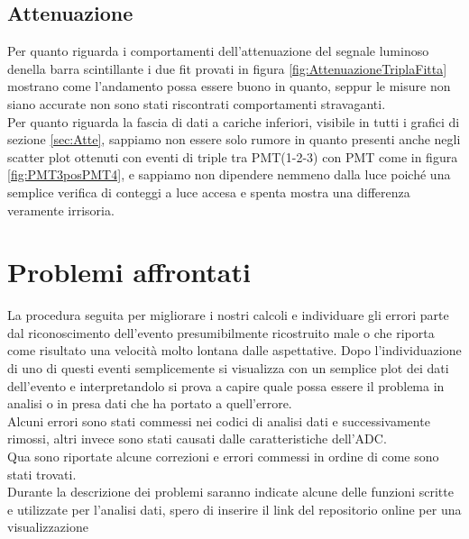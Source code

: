\documentclass[a4paper]{article}
\begin{document}
\subsection{Attenuazione}
Per quanto riguarda i comportamenti dell'attenuazione del segnale luminoso denella barra scintillante i due fit provati in figura \ref{fig:AttenuazioneTriplaFitta} mostrano come l'andamento possa essere buono in quanto, seppur le misure non siano accurate non sono
stati riscontrati comportamenti stravaganti.\\
Per quanto riguarda la fascia di dati a cariche inferiori, visibile in tutti i grafici di sezione \ref{sec:Atte}, sappiamo non essere solo rumore in quanto presenti anche negli scatter plot ottenuti con eventi di triple tra PMT(1-2-3) con PMT come in figura \ref{fig:PMT3posPMT4}, e sappiamo non dipendere nemmeno dalla luce poiché una semplice verifica di conteggi a luce accesa e spenta mostra una differenza veramente irrisoria.






\newpage
\appendix
\section{Problemi affrontati}
\label{secA:ProblemiADC}
La procedura seguita per migliorare i nostri calcoli e individuare gli errori parte dal riconoscimento dell'evento presumibilmente ricostruito male o che riporta come risultato una velocità molto lontana dalle aspettative. Dopo l'individuazione di uno di questi eventi semplicemente si visualizza con un semplice plot dei dati dell'evento e interpretandolo si prova a capire quale possa essere il problema in analisi o in presa dati che ha portato a quell'errore.\\
Alcuni errori sono stati commessi nei codici di analisi dati e successivamente rimossi, altri invece sono stati causati dalle caratteristiche dell'ADC.\\
Qua sono riportate alcune correzioni e errori commessi in ordine di come sono stati trovati.\\
Durante la descrizione dei problemi saranno indicate alcune delle funzioni scritte e utilizzate per l'analisi dati, spero di inserire il link del repositorio online per una visualizzazione
\end{document}
